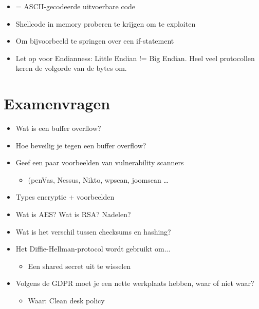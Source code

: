 \documentclass{article}
\begin{document}
\begin{itemize}
    \item = ASCII-gecodeerde uitvoerbare code
    \item Shellcode in memory proberen te krijgen om te exploiten
    \item Om bijvoorbeeld te springen over een if-statement
    \item Let op voor Endianness: Little Endian != Big Endian. Heel veel protocollen keren de volgorde van de bytes om.
\end{itemize}


\section{Examenvragen}

\begin{itemize}
    \item Wat is een buffer overflow?
    \item Hoe beveilig je tegen een buffer overflow?
    \item Geef een paar voorbeelden van vulnerability scanners 
    \begin{itemize}
        \item (penVas, Nessus, Nikto, wpscan, joomscan \dots
    \end{itemize}
    \item Types encryptie + voorbeelden
    \item Wat is AES? Wat is RSA? Nadelen?
    \item Wat is het verschil tussen checksums en hashing?
    \item Het Diffie-Hellman-protocol wordt gebruikt om...
    \begin{itemize}
        \item Een shared secret uit te wisselen 
    \end{itemize}
    \item Volgens de GDPR moet je een nette werkplaats hebben, waar of niet waar?
    \begin{itemize}
        \item Waar: Clean desk policy
    \end{itemize}
\end{itemize}
\end{document}
